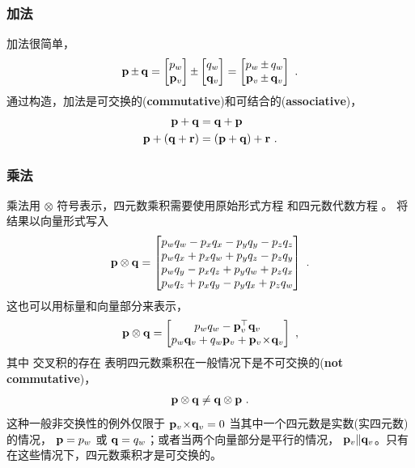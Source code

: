 \subsubsection{加法}

加法很简单，
%
\begin{align}
\bfp\pm\bfq = \begin{bmatrix}
p_w \\ \pv
\end{bmatrix} \pm \begin{bmatrix}
q_w \\ \qv
\end{bmatrix}
  = \begin{bmatrix}
p_w \pm q_w \\ \pv \pm \qv
\end{bmatrix}~.
\end{align}
%
通过构造，加法是可交换的(\textbf{commutative})和可结合的(\textbf{associative})，
%
%
\begin{align}
{\bf p}+{\bf q}&={\bf q}+{\bf p} \\
{\bf p}+({\bf q}+{\bf r})&=({\bf p}+{\bf q})+{\bf r}
~.
\end{align}%
%

\subsubsection{乘法}

乘法用 $\otimes$ 符号表示，四元数乘积需要使用原始形式方程  和四元数代数方程 。
将结果以向量形式写入
%
\begin{align}
{\bf p}\otimes{\bf q} = \begin{bmatrix}
p_wq_w - p_{x}q_{x} - p_{y}q_{y} - p_{z}q_{z} \\
p_wq_{x} + p_{x}q_w + p_{y}q_{z} - p_{z}q_{y} \\
p_wq_{y} - p_{x}q_{z} + p_{y}q_w + p_{z}q_{x} \\
p_wq_{z} + p_{x}q_{y} - p_{y}q_{x} + p_{z}q_w  
\end{bmatrix}~. \label{equ:quatProd}
\end{align}
%
这也可以用标量和向量部分来表示，
%
\begin{align}
{\bf p}\otimes{\bf q} = \begin{bmatrix}
p_wq_w - {\bf p}_v^{\top}{\bf q}_v \\
p_w{\bf q}_v+q_w{\bf p}_v+{\bf p}_v\!\times\!{\bf q}_v
\end{bmatrix}~, \label{equ:quatProdVec}
\end{align}
%
其中
交叉积的存在
表明四元数乘积在一般情况下是不可交换的(\textbf{not commutative})，
%
\begin{align}
{\bf p}\otimes{\bf q}\neq{\bf q}\otimes{\bf p}~.
\end{align}
%
这种一般非交换性的例外仅限于 ${\bf p}_v\!\times\!{\bf q}_v=0$ 当其中一个四元数是实数(实四元数)的情况， ${\bf p}=p_w$ 或 ${\bf q}=q_w$；或者当两个向量部分是平行的情况， ${\bf p}_v \| {\bf q}_v$。只有在这些情况下，四元数乘积才是可交换的。

